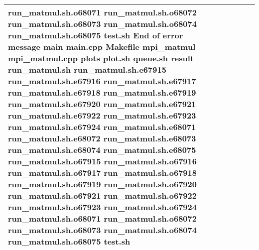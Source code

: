 \documentclass{article}
\begin{document}
\begin{tabular} { | l | l | l | l | l | l | }
run_matmul.sh.o68071 run_matmul.sh.o68072 run_matmul.sh.o68073 run_matmul.sh.o68074 run_matmul.sh.o68075 test.sh End of error message main main.cpp Makefile mpi_matmul mpi_matmul.cpp plots plot.sh queue.sh result run_matmul.sh run_matmul.sh.e67915 run_matmul.sh.e67916 run_matmul.sh.e67917 run_matmul.sh.e67918 run_matmul.sh.e67919 run_matmul.sh.e67920 run_matmul.sh.e67921 run_matmul.sh.e67922 run_matmul.sh.e67923 run_matmul.sh.e67924 run_matmul.sh.e68071 run_matmul.sh.e68072 run_matmul.sh.e68073 run_matmul.sh.e68074 run_matmul.sh.e68075 run_matmul.sh.o67915 run_matmul.sh.o67916 run_matmul.sh.o67917 run_matmul.sh.o67918 run_matmul.sh.o67919 run_matmul.sh.o67920 run_matmul.sh.o67921 run_matmul.sh.o67922 run_matmul.sh.o67923 run_matmul.sh.o67924 run_matmul.sh.o68071 run_matmul.sh.o68072 run_matmul.sh.o68073 run_matmul.sh.o68074 run_matmul.sh.o68075 test.sh \\ \hline

\end{tabular}
\end{document}
